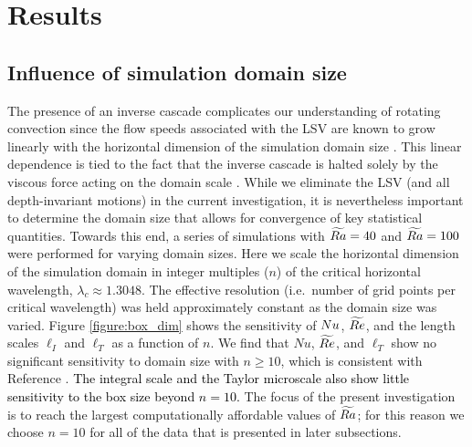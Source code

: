 \section{Results}
\label{sec:results}


\subsection{Influence of simulation domain size}
 
The presence of an inverse cascade complicates our understanding of rotating convection since the flow speeds associated with the LSV are known to grow linearly with the horizontal dimension of the simulation domain size \citep{sM21}. This linear dependence is tied to the fact that the inverse cascade is halted solely by the viscous force acting on the domain scale \citep{jN22}. While we eliminate the LSV (and all depth-invariant motions) in the current investigation, it is nevertheless important to determine the domain size that allows for convergence of key statistical quantities. 
Towards this end, a series of simulations with $\widetilde{Ra}=40$ and $\widetilde{Ra}=100$ were performed for varying domain sizes. Here we scale the horizontal dimension of the simulation domain in integer multiples ($n$) of the critical horizontal wavelength, $\lambda_c \approx 1.3048$.
The effective resolution (i.e.~number of grid points per critical wavelength) was held approximately constant as the domain size was varied.
Figure \ref{figure:box_dim} shows the sensitivity of $Nu$, $\widetilde{Re}$, and the length scales $\ell_{I}$ and $\ell_{T}$ as a function of $n$. We find that $Nu$, $\widetilde{Re}$, and $\ell_T$  show no significant sensitivity to domain size with $n \ge 10$, which is consistent with Reference \citep{sM21}. 
\textcolor{black}{The integral scale and the Taylor microscale also show little sensitivity to the box size beyond $n=10$.}
The focus of the present investigation is to reach the largest computationally affordable values of $\widetilde{Ra}$; for this reason we choose $n=10$ for all of the data that is presented in later subsections. 


